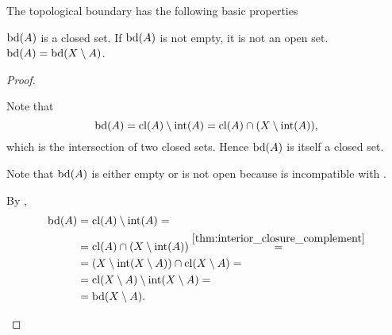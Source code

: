 \begin{proposition}\label{thm:topological_boundary_properties}
  The topological boundary has the following basic properties
  \begin{propenum}
     \( \operatorname{bd}(A) \) is a closed set.
     If \( \operatorname{bd}(A) \) is not empty, it is not an open set.
     \( \operatorname{bd}(A) = \operatorname{bd}(X \setminus A) \).
  \end{propenum}
\end{proposition}
\begin{proof}\mbox{}
  \begin{description}
     Note that
    \begin{equation*}
      \operatorname{bd}(A) = \operatorname{cl}(A) \setminus \operatorname{int}(A) = \operatorname{cl}(A) \cap (X \setminus \operatorname{int}(A)),
    \end{equation*}
    which is the intersection of two closed sets. Hence \( \operatorname{bd}(A) \) is itself a closed set.

     Note that \( \operatorname{bd}(A) \) is either empty or is not open because  is incompatible with .

     By ,
    \begin{align*}
      \operatorname{bd}(A)
      &=
      \operatorname{cl}(A) \setminus \operatorname{int}(A)
      = \\ &=
      \operatorname{cl}(A) \cap (X \setminus \operatorname{int}(A))
      \overset {\ref{thm:interior_closure_complement}} = \\ &=
      (X \setminus \operatorname{int}(X \setminus A)) \cap \operatorname{cl}(X \setminus A)
      = \\ &=
      \operatorname{cl}(X \setminus A) \setminus \operatorname{int}(X \setminus A)
      = \\ &=
      \operatorname{bd}(X \setminus A).
    \end{align*}
  \end{description}
\end{proof}

